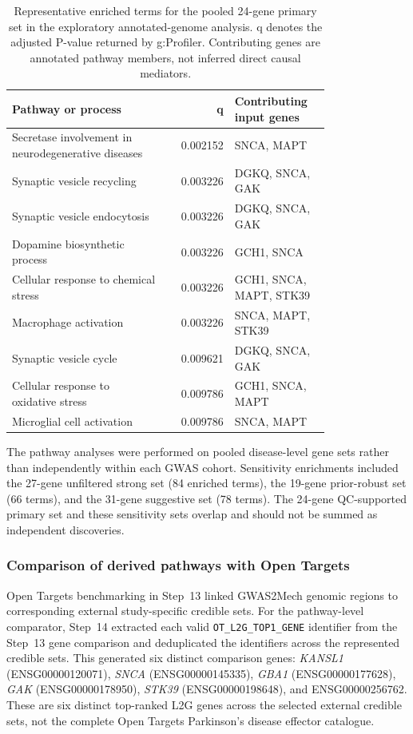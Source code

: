 \documentclass[11pt,a4paper]{article}
\begin{document}
\begin{table}[!htbp]
\centering\scriptsize
\caption{Representative enriched terms for the pooled 24-gene primary set in the exploratory annotated-genome analysis. q denotes the adjusted P-value returned by g:Profiler. Contributing genes are annotated pathway members, not inferred direct causal mediators.}
\label{tab:step14_pathways}
\begin{tabular}{@{}p{0.49\linewidth}rp{0.30\linewidth}@{}}
\toprule Pathway or process & q & Contributing input genes\\\midrule
Secretase involvement in neurodegenerative diseases & 0.002152 & SNCA, MAPT\\
Synaptic vesicle recycling & 0.003226 & DGKQ, SNCA, GAK\\
Synaptic vesicle endocytosis & 0.003226 & DGKQ, SNCA, GAK\\
Dopamine biosynthetic process & 0.003226 & GCH1, SNCA\\
Cellular response to chemical stress & 0.003226 & GCH1, SNCA, MAPT, STK39\\
Macrophage activation & 0.003226 & SNCA, MAPT, STK39\\
Synaptic vesicle cycle & 0.009621 & DGKQ, SNCA, GAK\\
Cellular response to oxidative stress & 0.009786 & GCH1, SNCA, MAPT\\
Microglial cell activation & 0.009786 & SNCA, MAPT\\
\bottomrule\end{tabular}
\end{table}

The pathway analyses were performed on pooled disease-level gene sets rather than independently within each GWAS cohort. Sensitivity enrichments included the 27-gene unfiltered strong set (84 enriched terms), the 19-gene prior-robust set (66 terms), and the 31-gene suggestive set (78 terms). The 24-gene QC-supported primary set and these sensitivity sets overlap and should not be summed as independent discoveries.

\subsubsection{Comparison of derived pathways with Open Targets}
Open Targets benchmarking in Step~13 linked GWAS2Mech genomic regions to corresponding external study-specific credible sets. For the pathway-level comparator, Step~14 extracted each valid \texttt{OT\_L2G\_TOP1\_GENE} identifier from the Step~13 gene comparison and deduplicated the identifiers across the represented credible sets. This generated six distinct comparison genes: \textit{KANSL1} (ENSG00000120071), \textit{SNCA} (ENSG00000145335), \textit{GBA1} (ENSG00000177628), \textit{GAK} (ENSG00000178950), \textit{STK39} (ENSG00000198648), and ENSG00000256762. These are six distinct top-ranked L2G genes across the selected external credible sets, not the complete Open Targets Parkinson's disease effector catalogue.
\end{document}
